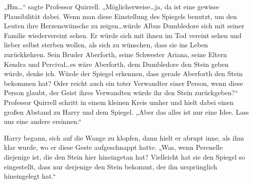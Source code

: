 „Hm…“ sagte Professor Quirrell. „Möglicherweise…ja, da ist eine gewisse Plausibilität dabei. Wenn man diese Einstellung des Spiegels benutzt, um den Leuten ihre Herzenswünsche zu zeigen…würde Albus Dumbledore sich mit seiner Familie wiedervereint sehen. Er würde sich mit ihnen im Tod vereint sehen und lieber selbst sterben wollen, als sich zu wünschen, dass sie ins Leben zurückkehren. Sein Bruder Aberforth, seine Schwester Ariana, seine Eltern Kendra und Percival…es wäre Aberforth, dem Dumbledore den Stein geben würde, denke ich. Würde der Spiegel erkennen, dass gerade Aberforth den Stein bekommen hat? Oder reicht auch ein toter Verwandter einer Person, wenn diese Person glaubt, der Geist ihres Verwandten würde ihr den Stein zurückgeben?“
Professor Quirrell schritt in einem kleinen Kreis umher und hielt dabei einen großen Abstand zu Harry und dem Spiegel.
„Aber das alles ist nur eine Idee. Lass uns eine andere ersinnen.“

Harry begann, sich auf die Wange zu klopfen, dann hielt er abrupt inne, als ihm klar wurde, wo er diese Geste aufgeschnappt hatte.
„Was, wenn Perenelle diejenige ist, die den Stein hier hineingetan hat? Vielleicht hat sie den Spiegel so eingestellt, dass nur derjenige den Stein bekommt, der ihn ursprünglich hineingelegt hat.“

